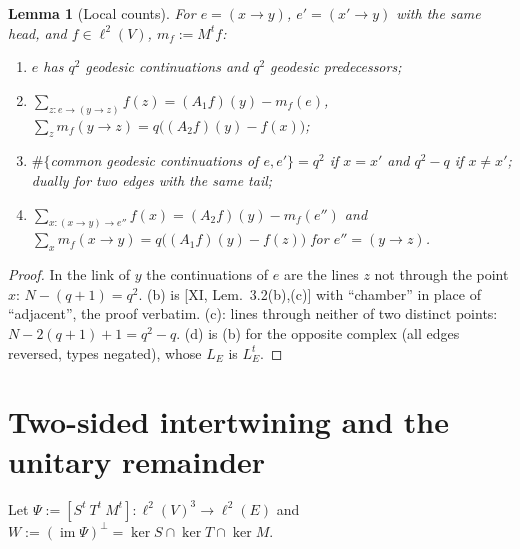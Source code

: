 \documentclass[11pt]{amsart}
\numberwithin{equation}{section}
\newtheorem{lemma}[theorem]{Lemma}
\theoremstyle{definition}
\theoremstyle{remark}
\newcommand{\LE}{L_E}
\newcommand{\im}{\operatorname{im}}
\begin{document}
\begin{lemma}[Local counts]\label{lem:local}
For $e=(x\to y)$, $e'=(x'\to y)$ with the same head, and $f\in\ell^{2}(V)$, $m_f:=M^{t}f$:
\begin{enumerate}
\item[(a)] $e$ has $q^{2}$ geodesic continuations and $q^{2}$ geodesic predecessors;
\item[(b)] $\sum_{z\colon e\to(y\to z)}f(z)=(A_1f)(y)-m_f(e)$,\quad
$\sum_{z}m_f(y\to z)=q\bigl((A_2f)(y)-f(x)\bigr)$;
\item[(c)] $\#\{$common geodesic continuations of $e,e'\}=q^{2}$ if $x=x'$ and $q^{2}-q$ if
$x\ne x'$; dually for two edges with the same tail;
\item[(d)] $\sum_{x\colon(x\to y)\to e''}f(x)=(A_2f)(y)-m_f(e'')$ and
$\sum_{x}m_f(x\to y)=q\bigl((A_1f)(y)-f(z)\bigr)$ for $e''=(y\to z)$.
\end{enumerate}
\end{lemma}

\begin{proof}
In the link of $y$ the continuations of $e$ are the lines $z$ not through the point $x$:
$N-(q{+}1)=q^{2}$. (b) is [XI, Lem.~3.2(b),(c)] with ``chamber'' in place of ``adjacent'', the
proof verbatim. (c): lines through neither of two distinct points: $N-2(q{+}1)+1=q^{2}-q$.
(d) is (b) for the opposite complex (all edges reversed, types negated), whose $\LE$ is
$\LE^{t}$.
\end{proof}

\section{Two-sided intertwining and the unitary remainder}\label{sec:intertwine}

Let $\Psi:=[S^{t}\ T^{t}\ M^{t}]\colon\ell^{2}(V)^{3}\to\ell^{2}(E)$ and
$W:=(\im\Psi)^{\perp}=\ker S\cap\ker T\cap\ker M$.
\end{document}
